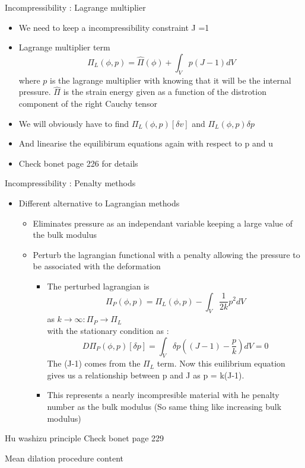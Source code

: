 	\begin{frame}{Incompressibility : Lagrange multiplier}
		\begin{itemize}
			\item We need to keep a incompressibility constraint J =1
			\item Lagrange multiplier term
			\begin{equation}
				\Pi_L(\phi,p) = \hat{\Pi}(\phi) + \int_V p(J-1) dV
			\end{equation}
			where $p$ is the lagrange multiplier with knowing that it will be the internal pressure. $\hat{\Pi}$ is the strain energy given as a function of the distrotion component of the right Cauchy tensor
			\item We will obviously have to find $\Pi_L(\phi,p)[\delta v ]$ and $\Pi_L(\phi,p)\delta p$
			\item And linearise the equilibirum equations again with respect to p and u
			\item Check bonet page 226 for details
		\end{itemize}
	\end{frame}


	\begin{frame}{Incompressibility : Penalty methods}
		\begin{itemize}
			\item Different alternative to Lagrangian methods
			\begin{itemize}
				\item Eliminates pressure as an independant variable keeping a large value of the bulk modulus
				\item Perturb the lagrangian functional with a penalty allowing the pressure to be associated with the deformation
				\begin{itemize}
					\item The perturbed lagrangian is 
					\begin{equation}
						\Pi_P(\phi,p) = \Pi_L(\phi,p) - \int_V \frac{1}{2k}p^2 dV
					\end{equation}
					as $k \rightarrow \infty : \Pi_P \rightarrow \Pi_L$ \\
					with the stationary condition as :
					\begin{equation}
					D\Pi_P(\phi,p)[\delta p] = \int_V \delta p \left((J-1)-\frac{p}{k} \right)dV = 0
					\end{equation}
					The (J-1) comes from the $\Pi_L$ term. Now this euilibrium equation gives us a relationship between p and J as p = k(J-1).
					\item This represents a nearly incompresible material with he penalty number as the bulk modulus (So same thing like increasing bulk modulus)
				\end{itemize}
				
			\end{itemize}
			
		\end{itemize}
	\end{frame}


	\begin{frame}{Hu washizu principle}
		Check bonet page 229
	\end{frame}

	
	\begin{frame}{Mean dilation procedure}
		content
	\end{frame}


